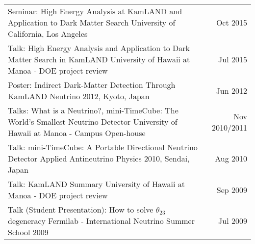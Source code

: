 \documentclass[11pt]{article} %
\begin{document}
\begin{tabularx}{\linewidth}{@{{}\textbullet\enskip}X@{\quad}r@{}}
\addlinespace[5pt]
Seminar: High Energy Analysis at KamLAND and Application to Dark Matter Search \newline University of California, Los Angeles & Oct 2015 \\

\addlinespace[5pt]
Talk: High Energy Analysis and Application to Dark Matter Search in KamLAND \newline University of Hawaii at Manoa - DOE project review & Jul 2015 \\

\addlinespace[5pt]
Poster: Indirect Dark-Matter Detection Through KamLAND \newline Neutrino 2012, Kyoto, Japan & Jun 2012 \\

\addlinespace[5pt]
Talks: What is a Neutrino?, mini-TimeCube: The World's Smallest Neutrino Detector \newline University of Hawaii at Manoa - Campus Open-house & Nov 2010/2011 \\

\addlinespace[5pt]
Talk: mini-TimeCube: A Portable Directional Neutrino Detector \newline Applied Antineutrino Physics 2010, Sendai, Japan & Aug 2010 \\

\addlinespace[5pt]
Talk: KamLAND Summary \newline University of Hawaii at Manoa - DOE project review & Sep 2009 \\

\addlinespace[5pt]
Talk (Student Presentation): How to solve $\theta_{23}$ degeneracy \newline Fermilab - International Neutrino Summer School 2009 & Jul 2009 \\

\end{tabularx}


\clearpage
\renewcommand\refname{Publications} %

\nocite{*} %
%
\end{document}
